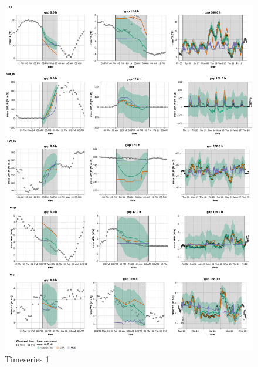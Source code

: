 \documentclass{article}
\newcommand{\imgwidth}{6in}
\begin{document}
\begin{figure}
\centerline{\includegraphics[width=\imgwidth]{images2/timeseries_1_2}}
\caption{Timeseries 1}
\label{fig:ts_3-1}
\end{figure}
\end{document}
